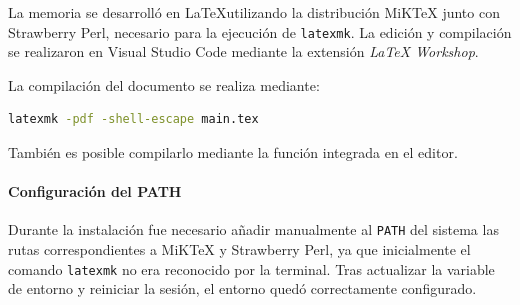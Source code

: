 La memoria se desarrolló en \LaTeX utilizando la distribución MiKTeX junto con Strawberry Perl, necesario para la ejecución de \texttt{latexmk}. La edición y compilación se realizaron en Visual Studio Code mediante la extensión \textit{LaTeX Workshop}.

La compilación del documento se realiza mediante:

\begin{lstlisting}[language=bash]
latexmk -pdf -shell-escape main.tex
\end{lstlisting}

También es posible compilarlo mediante la función integrada en el editor.

\paragraph{Configuración del PATH}

Durante la instalación fue necesario añadir manualmente al \texttt{PATH} del sistema las rutas correspondientes a MiKTeX y Strawberry Perl, ya que inicialmente el comando \texttt{latexmk} no era reconocido por la terminal. Tras actualizar la variable de entorno y reiniciar la sesión, el entorno quedó correctamente configurado.